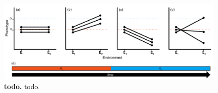 \begin{figure}[h!]
    \centering
    \includegraphics[width=\textwidth]{media/reaction-norms.pdf}
    \caption{\small
    \textbf{todo.}
    todo.
    }
    \label{fig:reaction-norms}
\end{figure}